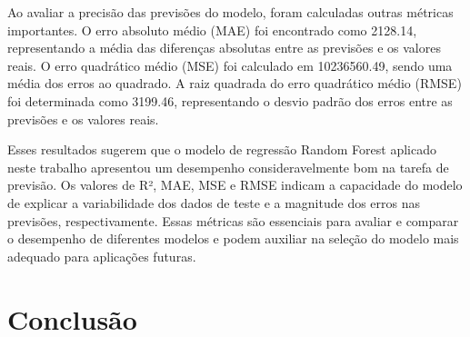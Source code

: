 \documentclass[conference]{IEEEtran}
\begin{document}
\begin{figure}[htbp]
  \centering
  \begin{floatrow}
  \end{floatrow}
\end{figure}

Ao avaliar a precisão das previsões do modelo, foram calculadas outras métricas importantes. O erro absoluto médio (MAE) foi encontrado como 2128.14, representando a média das diferenças absolutas entre as previsões e os valores reais. O erro quadrático médio (MSE) foi calculado em 10236560.49, sendo uma média dos erros ao quadrado. A raiz quadrada do erro quadrático médio (RMSE) foi determinada como 3199.46, representando o desvio padrão dos erros entre as previsões e os valores reais.

Esses resultados sugerem que o modelo de regressão Random Forest aplicado neste trabalho apresentou um desempenho consideravelmente bom na tarefa de previsão. Os valores de R², MAE, MSE e RMSE indicam a capacidade do modelo de explicar a variabilidade dos dados de teste e a magnitude dos erros nas previsões, respectivamente. Essas métricas são essenciais para avaliar e comparar o desempenho de diferentes modelos e podem auxiliar na seleção do modelo mais adequado para aplicações futuras.

\section*{Conclusão}
\end{document}
